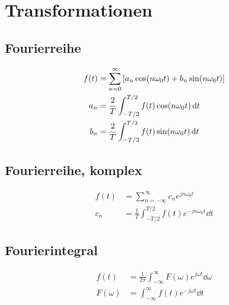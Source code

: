 \documentclass[10pt,a4paper]{article}
\begin{document}
  \section{Transformationen}
  \subsection{Fourierreihe}
  \begin{mdframed}[style=exercise]
    \begin{align}
      f(t) &= \sum_{n=0}^{\infty} \qty[a_n \cos(n \omega_0 t) + b_n \sin(n \omega_0 t)]\\
      a_n &= \frac{2}{T}\int_{-T/2}^{T/2}f(t)\cos(n\omega_0 t)\dd{t}\nonumber\\
      b_n &= \frac{2}{T}\int_{-T/2}^{T/2}f(t)\sin(n\omega_0 t)\dd{t}\nonumber
    \end{align}
  \end{mdframed}
  \pagebreak
  \subsection{Fourierreihe, komplex}
  \begin{mdframed}[style=exercise]
    \begin{align}
      f(t) &= \sum_{n=-\infty}^{\infty} c_n e^{jn\omega_0 t}\\
      c_n &= \frac{1}{T} \int_{-T/2}^{T/2} f(t) e^{-jn\omega_0 t}\dd{t}\nonumber
    \end{align}
  \end{mdframed}
  \subsection{Fourierintegral}
  \begin{mdframed}[style=exercise]
    \begin{align}
      f(t) &= \frac{1}{2\pi} \int_{-\infty}^{\infty} F(\omega) e^{j\omega t} \dd{\omega}\\
      F(\omega) &= \int_{-\infty}^{\infty} f(t) e^{-j\omega t} \dd{t}
    \end{align}
  \end{mdframed}
\end{document}
